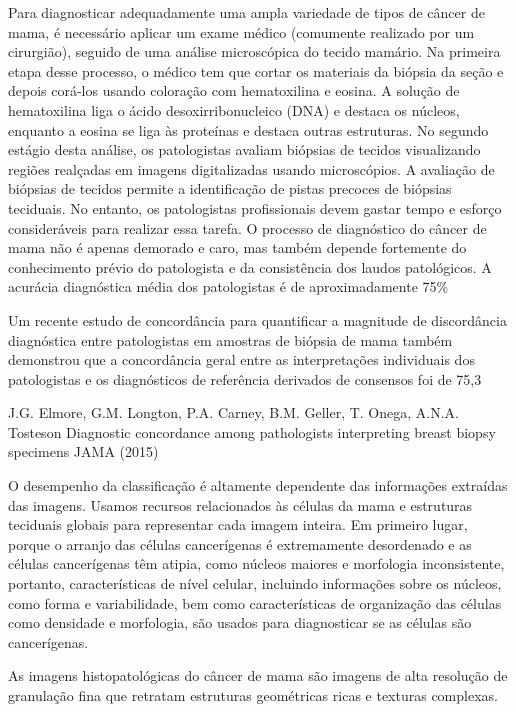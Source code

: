 \documentclass[preprint,12pt,authoryear]{elsarticle}
\begin{document}
 Para diagnosticar adequadamente uma ampla variedade de tipos de câncer de mama, é necessário aplicar um exame médico (comumente realizado por um cirurgião), seguido de uma análise microscópica do tecido mamário. Na primeira etapa desse processo, o médico tem que cortar os materiais da biópsia da seção e depois corá-los usando coloração com hematoxilina e eosina. A solução de hematoxilina liga o ácido desoxirribonucleico (DNA) e destaca os núcleos, enquanto a eosina se liga às proteínas e destaca outras estruturas. No segundo estágio desta análise, os patologistas avaliam biópsias de tecidos visualizando regiões realçadas em imagens digitalizadas usando microscópios. A avaliação de biópsias de tecidos permite a identificação de pistas precoces de biópsias teciduais. No entanto, os patologistas profissionais devem gastar tempo e esforço consideráveis para realizar essa tarefa. O processo de diagnóstico do câncer de mama não é apenas demorado e caro, mas também depende fortemente do conhecimento prévio do patologista e da consistência dos laudos patológicos. A acurácia diagnóstica média dos patologistas é de aproximadamente 75\%
 
 Um recente estudo de concordância para quantificar a magnitude de discordância diagnóstica entre patologistas em amostras de biópsia de mama também demonstrou que a concordância geral entre as interpretações individuais dos patologistas e os diagnósticos de referência derivados de consensos foi de 75,3%
 
J.G. Elmore, G.M. Longton, P.A. Carney, B.M. Geller, T. Onega, A.N.A. Tosteson Diagnostic concordance among pathologists interpreting breast biopsy specimens JAMA (2015)


O desempenho da classificação é altamente dependente das informações extraídas das imagens. Usamos recursos relacionados às células da mama e estruturas teciduais globais para representar cada imagem inteira. Em primeiro lugar, porque o arranjo das células cancerígenas é extremamente desordenado e as células cancerígenas têm atipia, como núcleos maiores e morfologia inconsistente, portanto, características de nível celular, incluindo informações sobre os núcleos, como forma e variabilidade, bem como características de organização das células como densidade e morfologia, são usados para diagnosticar se as células são cancerígenas.

As imagens histopatológicas do câncer de mama são imagens de alta resolução de granulação fina que retratam estruturas geométricas ricas e texturas complexas.
\end{document}
